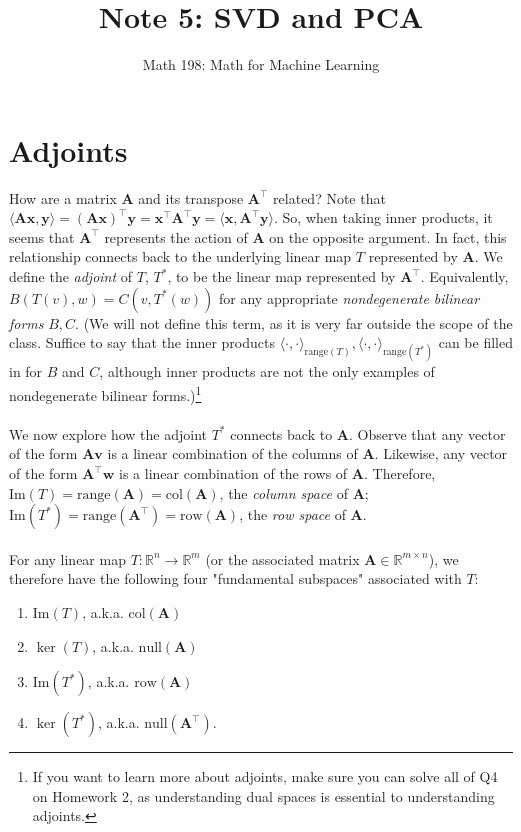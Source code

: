 \documentclass{article}
\title{Note 5: SVD and PCA}
\author{Math 198: Math for Machine Learning}
\date{}
\begin{document}
\maketitle

\section{Adjoints}
How are a matrix $\mathbf{A}$ and its transpose $\mathbf{A}^{\top}$ related? Note that $\langle \mathbf{Ax, y} \rangle = \mathbf{(Ax)^{\top}y} = \mathbf{x^{\top}A^{\top}y} = \langle \mathbf{x, A^{\top}y} \rangle$. So, when taking inner products, it seems that $\mathbf{A^{\top}}$ represents the action of $\mathbf{A}$ on the opposite argument. In fact, this relationship connects back to the underlying linear map $T$ represented by $\mathbf{A}$. We define the \textit{adjoint} of $T$, $T^*$, to be the linear map represented by $\mathbf{A^{\top}}$. Equivalently, $B(T(v), w) = C(v, T^*(w))$ for any appropriate \textit{nondegenerate bilinear forms} $B, C$. (We will not define this term, as it is very far outside the scope of the class. Suffice to say that the inner products $\langle \cdot, \cdot \rangle_{\text{range}(T)}, \langle \cdot, \cdot \rangle_{\text{range}(T^*)}$ can be filled in for $B$ and $C$, although inner products are not the only examples of nondegenerate bilinear forms.)\footnote{If you want to learn more about adjoints, make sure you can solve all of Q4 on Homework 2, as understanding dual spaces is essential to understanding adjoints.} \\\\
We now explore how the adjoint $T^*$ connects back to $\mathbf{A}$. Observe that any vector of the form $\mathbf{Av}$ is a linear combination of the columns of $\mathbf{A}$. Likewise, any vector of the form $\mathbf{A^{\top}w}$ is a linear combination of the rows of $\mathbf{A}$. Therefore, $\text{Im}(T) = \text{range}(\mathbf{A}) = \text{col}(\mathbf{A})$, the \textit{column space} of $\mathbf{A}$; $\text{Im}(T^*) = \text{range}(\mathbf{A}^{\top}) = \text{row}(\mathbf{A})$, the \textit{row space} of $\mathbf{A}$. \\\\
For any linear map $T: \mathbb{R}^n \to \mathbb{R}^m$ (or the associated matrix $\textbf{A} \in \mathbb{R}^{m \times n}$), we therefore have the following four "fundamental subspaces" associated with $T$:
\begin{enumerate}
    \item $\text{Im}(T)$, a.k.a. $\text{col}(\textbf{A})$
    \item $\ker(T)$, a.k.a. $\text{null}(\textbf{A})$
    \item $\text{Im}(T^*)$, a.k.a. $\text{row}(\textbf{A})$
    \item $\ker(T^*)$, a.k.a. $\text{null}(\textbf{A}^\top)$.
\end{enumerate}
\end{document}
